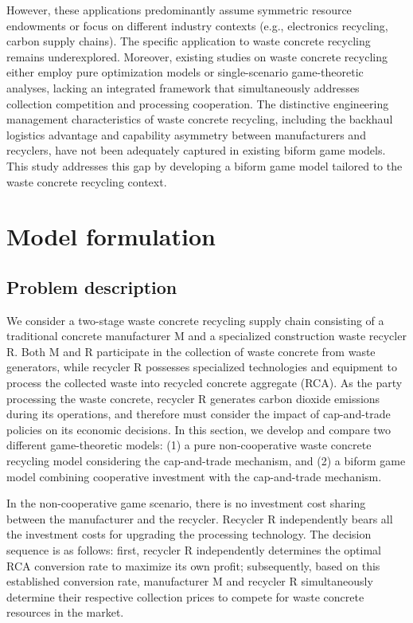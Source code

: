 \documentclass[authoryear,preprint,review,times,10pt]{elsarticle}
\begin{document}
However, these applications predominantly assume symmetric resource endowments or focus on different industry contexts (e.g., electronics recycling, carbon supply chains). The specific application to waste concrete recycling remains underexplored. Moreover, existing studies on waste concrete recycling either employ pure optimization models or single-scenario game-theoretic analyses, lacking an integrated framework that simultaneously addresses collection competition and processing cooperation. The distinctive engineering management characteristics of waste concrete recycling, including the backhaul logistics advantage and capability asymmetry between manufacturers and recyclers, have not been adequately captured in existing biform game models. This study addresses this gap by developing a biform game model tailored to the waste concrete recycling context.

\section{Model formulation}
\subsection{Problem description}
We consider a two-stage waste concrete recycling supply chain consisting of a traditional concrete manufacturer M and a specialized construction waste recycler R. Both M and R participate in the collection of waste concrete from waste generators, while recycler R possesses specialized technologies and equipment to process the collected waste into recycled concrete aggregate (RCA). As the party processing the waste concrete, recycler R generates carbon dioxide emissions during its operations, and therefore must consider the impact of cap-and-trade policies on its economic decisions. In this section, we develop and compare two different game-theoretic models: (1) a pure non-cooperative waste concrete recycling model considering the cap-and-trade mechanism, and (2) a biform game model combining cooperative investment with the cap-and-trade mechanism.

In the non-cooperative game scenario, there is no investment cost sharing between the manufacturer and the recycler. Recycler R independently bears all the investment costs for upgrading the processing technology. The decision sequence is as follows: first, recycler R independently determines the optimal RCA conversion rate to maximize its own profit; subsequently, based on this established conversion rate, manufacturer M and recycler R simultaneously determine their respective collection prices to compete for waste concrete resources in the market.
\end{document}
